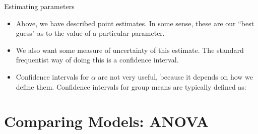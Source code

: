 \begin{frame}[allowframebreaks]{Estimating parameters}
\begin{itemize}
  \framebreak
  
  \item Above, we have described \alert{point estimates}. In some sense, these are our ``best guess" as to the value of a particular parameter.
  \item We also want some measure of uncertainty of this estimate. The standard frequentist way of doing this is a \alert{confidence interval}.
  \item Confidence intervals for $\alpha$ are not very useful, because it depends on how we define them. Confidence intervals for group means are typically defined as:
  \end{itemize}
  
\end{frame}

\section{Comparing Models: ANOVA}

